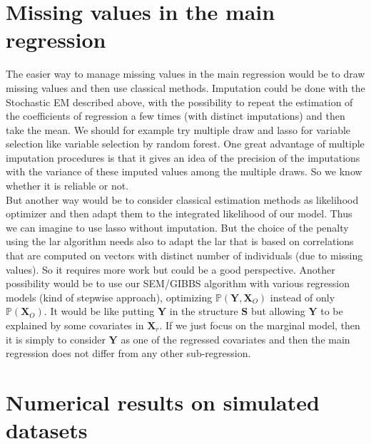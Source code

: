\documentclass[12pt,a4paper]{report}
\begin{document}
	\section{Missing values in the main regression}
		The easier way to manage missing values in the main regression would be to draw missing values and then use classical methods. Imputation could be done with the Stochastic EM described above, with the possibility to repeat the estimation of the coefficients of regression a few times (with distinct imputations) and then take the mean. We should for example try multiple draw and {\sc lasso} for variable selection like variable selection by random forest. One great advantage of multiple imputation procedures is that it gives an idea of the precision of the imputations with the variance of these imputed values among the multiple draws. So we know whether it is reliable or not. \\
		
		
				

		
		But another way would be to consider classical estimation methods as likelihood optimizer and then adapt them to the integrated likelihood of our model. Thus we can imagine to use {\sc lasso} without imputation. But the choice of the penalty using the {\sc lar} algorithm needs also to adapt the {\sc lar} that is based on correlations that are computed on vectors with distinct number of individuals (due to missing values). So it requires more work but could be a good perspective. Another possibility would be to use our SEM/GIBBS algorithm with various regression models (kind of stepwise approach), optimizing $\mathbb{P}(\boldsymbol{Y},\boldsymbol{X}_O)$ instead of only  $\mathbb{P}(\boldsymbol{X}_O)$. It would be like putting $\boldsymbol{Y}$ in the structure $\boldsymbol{S}$ but allowing $\boldsymbol{Y}$ to be explained by some covariates in $\boldsymbol{X}_r$. If we just focus on the marginal model, then it is simply to consider $\boldsymbol{Y}$ as one of the regressed covariates and then the main regression does not differ from any other sub-regression.
		
	\section{Numerical results on simulated datasets}
\end{document}
